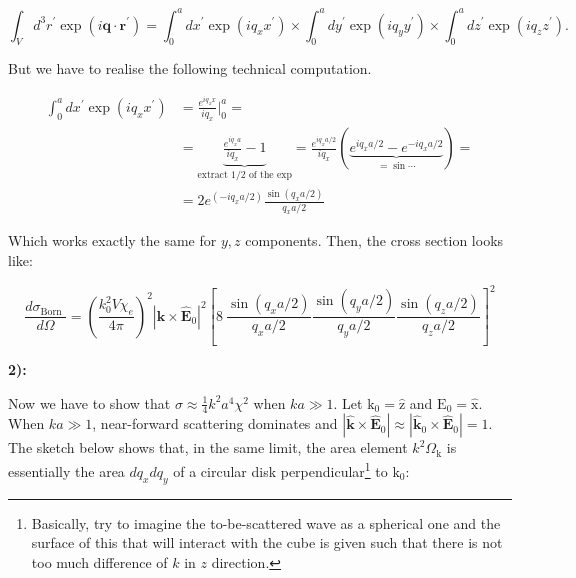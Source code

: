 \begin{equation}
	\int_{V} d^{3} r^{\prime} \exp \left(i \mathbf{q} \cdot \mathbf{r}^{\prime}\right)=\int_{0}^{a} d x^{\prime} \exp \left(i q_{x} x^{\prime}\right) \times \int_{0}^{a} d y^{\prime} \exp \left(i q_{y} y^{\prime}\right) \times \int_{0}^{a} d z^{\prime} \exp \left(i q_{z} z^{\prime}\right).
\end{equation}

But we have to realise the following technical computation.
	
\begin{equation}
	\begin{split}
		\int_{0}^{a} d x^{\prime} \exp \left(i q_{x} x^{\prime}\right)&= \frac{e^{i q_{x} x}}{i q_{x}} |^{a}_{0}=\\
		&= \underbrace{\tfrac{e^{iq_{x}a}}{i q_{x}} - 1}_{\text{extract $1/2$ of the exp}} = \tfrac{e^{iq_{x}a/2}}{i q_{x}}(\underbrace{e^{i q_{x}a/2}-e^{-i q_{x}a/2}}_{=\sin \cdots})=\\
		&=2 e^{ \left(-i q_{x} a / 2\right)} \frac{\sin \left(q_{x} a / 2\right)}{q_{x} a / 2}
	\end{split}
\end{equation}

Which works exactly the same for $y,z$ components. Then, the cross section looks like:

\begin{equation}
	\frac{d \sigma_{\text {Born }}}{d \Omega}=\left(\frac{k_{0}^{2} V \chi_{e}}{4 \pi}\right)^{2}\left|\hat{\mathbf{k}} \times \hat{\mathbf{E}}_{0}\right|^{2}\left[8\: \frac{\sin \left(q_{x} a / 2\right)}{q_{x} a / 2} \frac{\sin \left(q_{y} a / 2\right)}{q_{y} a / 2} \frac{\sin \left(q_{z} a / 2\right)}{q_{z} a / 2}\right]^{2}
\end{equation}

\textbf{2):}

Now we have to show that $\sigma \approx \tfrac{1}{4}k^{2}a^{4}\chi^{2}$ when $ka\gg 1$. Let $\mathrm{k}_{0}=\hat{\mathrm{z}}$ and $\mathrm{E}_{0}=\hat{\mathrm{x}}$. When $k a \gg 1$, near-forward scattering dominates and $\left|\hat{\mathbf{k}} \times \hat{\mathbf{E}}_{0}\right| \approx\left|\hat{\mathbf{k}}_{0} \times \hat{\mathbf{E}}_{0}\right|=1$. The sketch below shows that, in the same limit, the area element $k^{2}\Omega_{\mathrm{k}}$ is essentially the area $d q_{x} d q_{y}$ of a circular disk perpendicular\footnote{Basically, try to imagine the to-be-scattered wave as a spherical one and the surface of this that will interact with the cube is given such that there is not too much difference of $k$ in $z$ direction.} to $\mathrm{k}_{0}$:


